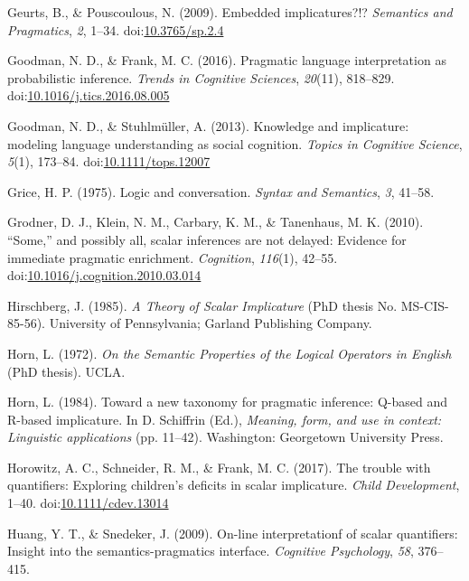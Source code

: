 \documentclass[man]{apa6}
\theoremstyle{definition}
\theoremstyle{definition}
\theoremstyle{definition}
\theoremstyle{remark}
\begin{document}
\hypertarget{ref-Geurts2009}{}
Geurts, B., \& Pouscoulous, N. (2009). Embedded implicatures?!?
\emph{Semantics and Pragmatics}, \emph{2}, 1--34.
doi:\href{https://doi.org/10.3765/sp.2.4}{10.3765/sp.2.4}

\hypertarget{ref-Goodman2016}{}
Goodman, N. D., \& Frank, M. C. (2016). Pragmatic language
interpretation as probabilistic inference. \emph{Trends in Cognitive
Sciences}, \emph{20}(11), 818--829.
doi:\href{https://doi.org/10.1016/j.tics.2016.08.005}{10.1016/j.tics.2016.08.005}

\hypertarget{ref-Goodman2013}{}
Goodman, N. D., \& Stuhlmüller, A. (2013). Knowledge and implicature:
modeling language understanding as social cognition. \emph{Topics in
Cognitive Science}, \emph{5}(1), 173--84.
doi:\href{https://doi.org/10.1111/tops.12007}{10.1111/tops.12007}

\hypertarget{ref-grice1975}{}
Grice, H. P. (1975). Logic and conversation. \emph{Syntax and
Semantics}, \emph{3}, 41--58.

\hypertarget{ref-Grodner2010}{}
Grodner, D. J., Klein, N. M., Carbary, K. M., \& Tanenhaus, M. K.
(2010). ``Some,'' and possibly all, scalar inferences are not delayed:
Evidence for immediate pragmatic enrichment. \emph{Cognition},
\emph{116}(1), 42--55.
doi:\href{https://doi.org/10.1016/j.cognition.2010.03.014}{10.1016/j.cognition.2010.03.014}

\hypertarget{ref-Hirschberg1985}{}
Hirschberg, J. (1985). \emph{A Theory of Scalar Implicature} (PhD thesis
No. MS-CIS-85-56). University of Pennsylvania; Garland Publishing
Company.

\hypertarget{ref-Horn1972}{}
Horn, L. (1972). \emph{On the Semantic Properties of the Logical
Operators in English} (PhD thesis). UCLA.

\hypertarget{ref-horn1984}{}
Horn, L. (1984). Toward a new taxonomy for pragmatic inference: Q-based
and R-based implicature. In D. Schiffrin (Ed.), \emph{Meaning, form, and
use in context: Linguistic applications} (pp. 11--42). Washington:
Georgetown University Press.

\hypertarget{ref-Horowitz2017}{}
Horowitz, A. C., Schneider, R. M., \& Frank, M. C. (2017). The trouble
with quantifiers: Exploring children's deficits in scalar implicature.
\emph{Child Development}, 1--40.
doi:\href{https://doi.org/10.1111/cdev.13014}{10.1111/cdev.13014}

\hypertarget{ref-huang2009}{}
Huang, Y. T., \& Snedeker, J. (2009). On-line interpretationf of scalar
quantifiers: Insight into the semantics-pragmatics interface.
\emph{Cognitive Psychology}, \emph{58}, 376--415.
\end{document}
